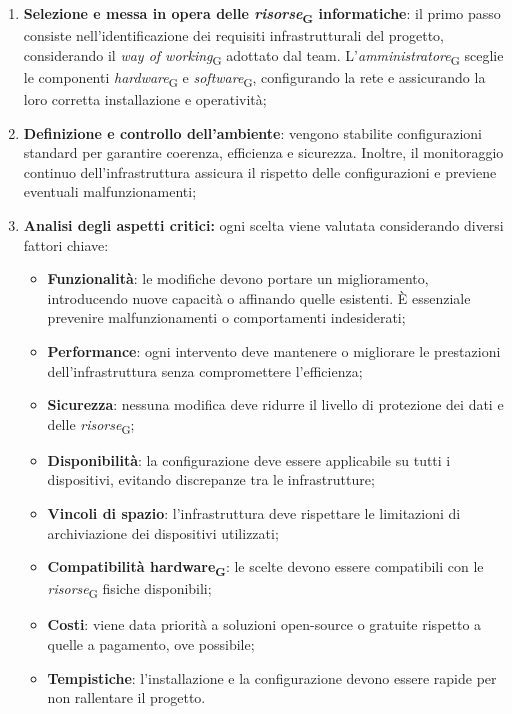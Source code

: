 \begin{enumerate}
    \item \textbf{Selezione e messa in opera delle \textit{risorse}\textsubscript{G} informatiche}: il primo passo consiste nell’identificazione dei requisiti infrastrutturali del progetto, considerando il \textit{way of working}\textsubscript{G} adottato dal team. L'\textit{amministratore}\textsubscript{G} sceglie le componenti \textit{hardware}\textsubscript{G} e \textit{software}\textsubscript{G}, configurando la rete e assicurando la loro corretta installazione e operatività;
    \item \textbf{Definizione e controllo dell’ambiente}: vengono stabilite configurazioni standard per garantire coerenza, efficienza e sicurezza. Inoltre, il monitoraggio continuo dell’infrastruttura assicura il rispetto delle configurazioni e previene eventuali malfunzionamenti;
    \item \textbf{Analisi degli aspetti critici:} ogni scelta viene valutata considerando diversi fattori chiave:
    \begin{itemize}
        \item \textbf{Funzionalità}: le modifiche devono portare un miglioramento, introducendo nuove capacità o affinando quelle esistenti. È essenziale prevenire malfunzionamenti o comportamenti indesiderati;
        \item \textbf{Performance}: ogni intervento deve mantenere o migliorare le prestazioni dell'infrastruttura senza compromettere l'efficienza;
        \item \textbf{Sicurezza}: nessuna modifica deve ridurre il livello di protezione dei dati e delle \textit{risorse}\textsubscript{G};
        \item \textbf{Disponibilità}: la configurazione deve essere applicabile su tutti i dispositivi, evitando discrepanze tra le infrastrutture;
        \item \textbf{Vincoli di spazio}: l'infrastruttura deve rispettare le limitazioni di archiviazione dei dispositivi utilizzati;
        \item \textbf{Compatibilità hardware\textsubscript{G}}: le scelte devono essere compatibili con le \textit{risorse}\textsubscript{G} fisiche disponibili;
        \item \textbf{Costi}: viene data priorità a soluzioni open-source o gratuite rispetto a quelle a pagamento, ove possibile;
        \item \textbf{Tempistiche}: l'installazione e la configurazione devono essere rapide per non rallentare il progetto.

\end{itemize}
\end{enumerate}
